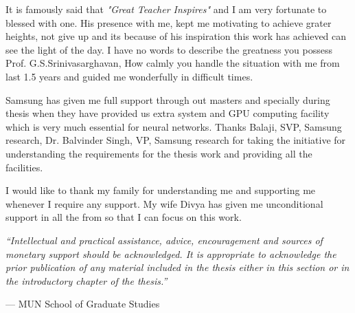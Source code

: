 It is famously said that \textit{"Great Teacher Inspires"} and I am very fortunate to blessed with one. His presence with me, kept me motivating to achieve grater heights, not give up and its because of his inspiration this work has achieved can see the light of the day. I have no words to describe the greatness you possess Prof. G.S.Srinivasarghavan, How calmly you handle the situation with me from last 1.5 years and guided me wonderfully in difficult times. 

Samsung has given me full support through out masters and specially during thesis when they have provided us extra system and GPU computing facility which is very much essential for neural networks. Thanks Balaji, SVP, Samsung research, Dr. Balvinder Singh, VP, Samsung research for taking the initiative for understanding the requirements for the thesis work and providing all the facilities.

I would like to thank my family for understanding me and supporting me whenever I require any support. My wife Divya has given me unconditional support in all the from so that I can focus on this work.


\vspace{1cm}

\emph{``Intellectual and practical assistance, advice, encouragement and
sources of monetary support should be acknowledged. It is appropriate to
acknowledge the prior publication of any material included in the thesis
either in this section or in the introductory chapter of the thesis.''}

\hfill --- MUN School of Graduate Studies
